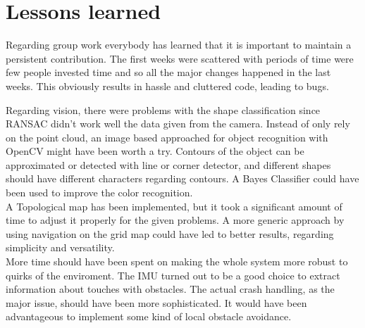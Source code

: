 \section{Lessons learned}


Regarding group work everybody has learned that it is important to maintain a persistent contribution.
The first weeks were scattered with periods of time were few people invested time and so all the major changes happened in the last weeks.
This obviously results in hassle and cluttered code, leading to bugs.

Regarding vision, there were problems with the shape classification since RANSAC didn't work well the data given from the camera. 
Instead of only rely on the point cloud, an image based approached for object recognition with OpenCV might have been worth a try. 
Contours of the object can be approximated or detected with line or corner detector, and different shapes should have different characters regarding contours.
A Bayes Classifier could have been used to improve the color recognition.\\

\setlength{\parindent}{0pt}A Topological map has been implemented, but it took a significant amount of time to adjust it properly for the given problems.
A more generic approach by using navigation on the grid map could have led to better results, regarding simplicity and versatility.\\

\setlength{\parindent}{0pt}More time should have been spent on making the whole system more robust to quirks of the enviroment.
The IMU turned out to be a good choice to extract information about touches with obstacles.
The actual crash handling, as the major issue, should have been more sophisticated.
It would have been advantageous to implement some kind of local obstacle avoidance.

